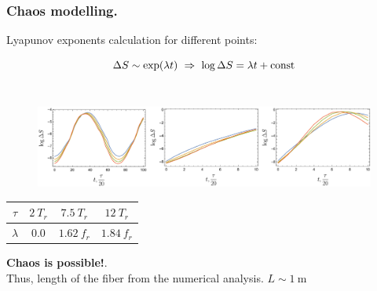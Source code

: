 \begin{frame}
  \frametitle{Chaos modelling.}
  Lyapunov exponents calculation for different points:
  
  $$\Delta S \sim \exp(\lambda t) \ \Rightarrow \ \log \Delta S = \lambda t + \const$$\\[5pt]
  
  \begin{figure}[h]
    \includegraphics[width=1.0\textwidth]{figures/lyapunovs.pdf}
  \end{figure}
  
  \begin{center}
      \begin{tabular}{c|c|c|c}
        $\tau$ & $2 \ T_r$ & $7.5 \ T_r$ & $12 \ T_r$ \\ \hline
        $\lambda$ & $0.0$ & $1.62 \ f_r$ & $1.84 \ f_r$
      \end{tabular}
  \end{center}
    
  \phantom{42}
  
  \textbf{Chaos is possible!}. \\
  Thus, length of the fiber from the numerical analysis. $L \sim 1 \ \text{m}$
  
\end{frame}